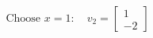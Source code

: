 \documentclass{article}
\begin{document}
\begin{align*}
\text{Choose } x=1: \quad\boxed{v_2 = \begin{bmatrix} 1 \\ -2 \end{bmatrix}}
\end{align*}
\end{document}
